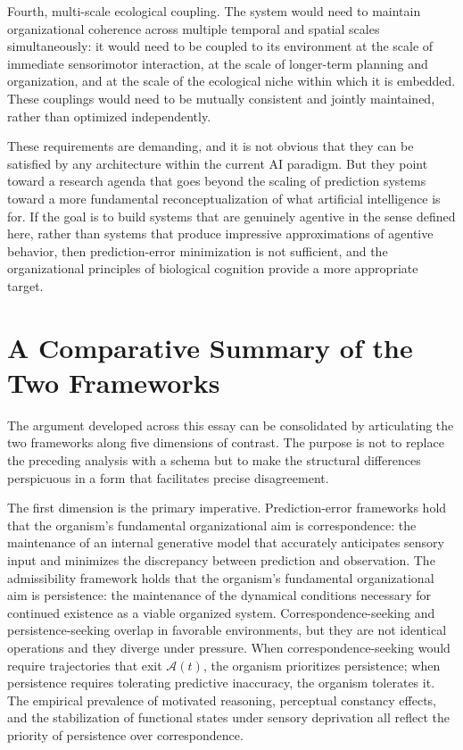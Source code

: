\documentclass[12pt,a4paper]{report}
\theoremstyle{flyxion}
\begin{document}
Fourth, multi-scale ecological coupling. The system would need to maintain organizational coherence across multiple temporal and spatial scales simultaneously: it would need to be coupled to its environment at the scale of immediate sensorimotor interaction, at the scale of longer-term planning and organization, and at the scale of the ecological niche within which it is embedded. These couplings would need to be mutually consistent and jointly maintained, rather than optimized independently.

These requirements are demanding, and it is not obvious that they can be satisfied by any architecture within the current AI paradigm. But they point toward a research agenda that goes beyond the scaling of prediction systems toward a more fundamental reconceptualization of what artificial intelligence is for. If the goal is to build systems that are genuinely agentive in the sense defined here, rather than systems that produce impressive approximations of agentive behavior, then prediction-error minimization is not sufficient, and the organizational principles of biological cognition provide a more appropriate target.

\section{A Comparative Summary of the Two Frameworks}

The argument developed across this essay can be consolidated by articulating the two frameworks along five dimensions of contrast. The purpose is not to replace the preceding analysis with a schema but to make the structural differences perspicuous in a form that facilitates precise disagreement.

The first dimension is the primary imperative. Prediction-error frameworks hold that the organism's fundamental organizational aim is correspondence: the maintenance of an internal generative model that accurately anticipates sensory input and minimizes the discrepancy between prediction and observation. The admissibility framework holds that the organism's fundamental organizational aim is persistence: the maintenance of the dynamical conditions necessary for continued existence as a viable organized system. Correspondence-seeking and persistence-seeking overlap in favorable environments, but they are not identical operations and they diverge under pressure. When correspondence-seeking would require trajectories that exit $\mathcal{A}(t)$, the organism prioritizes persistence; when persistence requires tolerating predictive inaccuracy, the organism tolerates it. The empirical prevalence of motivated reasoning, perceptual constancy effects, and the stabilization of functional states under sensory deprivation all reflect the priority of persistence over correspondence.
\end{document}
